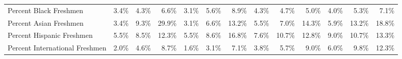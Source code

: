 \documentclass[
  12pt,
]{article}
\begin{document}
\begin{landscape}
\begin{table}
{\begin{tabular}[t]{lrrrrrrrrrrrr}
Percent Black Freshmen & 3.4\% & 4.3\% & 6.6\% & 3.1\% & 5.6\% & 8.9\% & 4.3\% & 4.7\% & 5.0\% & 4.0\% & 5.3\% & 7.1\%\\
Percent Asian Freshmen & 3.4\% & 9.3\% & 29.9\% & 3.1\% & 6.6\% & 13.2\% & 5.5\% & 7.0\% & 14.3\% & 5.9\% & 13.2\% & 18.8\%\\
Percent Hispanic Freshmen & 5.5\% & 8.5\% & 12.3\% & 5.5\% & 8.6\% & 16.8\% & 7.6\% & 10.7\% & 12.8\% & 9.0\% & 10.7\% & 13.3\%\\
Percent International Freshmen & 2.0\% & 4.6\% & 8.7\% & 1.6\% & 3.1\% & 7.1\% & 3.8\% & 5.7\% & 9.0\% & 6.0\% & 9.8\% & 12.3\%\\
\bottomrule
\end{tabular}}
\end{table}

\clearpage


\end{landscape}
\end{document}
